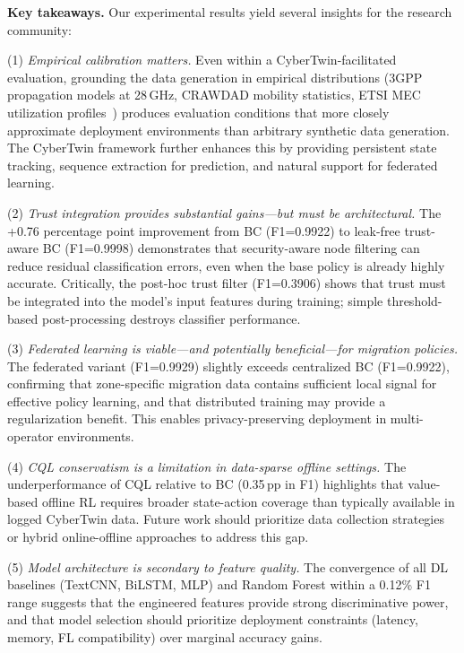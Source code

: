 \documentclass[journal,twoside]{IEEEtran}
\begin{document}
\textbf{Key takeaways.} Our experimental results yield several insights for the research community:

(1) \textit{Empirical calibration matters.} Even within a CyberTwin-facilitated evaluation, grounding the data generation in empirical distributions (3GPP propagation models at 28\,GHz, CRAWDAD mobility statistics, ETSI MEC utilization profiles~\cite{etsi_mec003}) produces evaluation conditions that more closely approximate deployment environments than arbitrary synthetic data generation. The CyberTwin framework further enhances this by providing persistent state tracking, sequence extraction for prediction, and natural support for federated learning.

(2) \textit{Trust integration provides substantial gains---but must be architectural.} The +0.76 percentage point improvement from BC (F1=0.9922) to leak-free trust-aware BC (F1=0.9998) demonstrates that security-aware node filtering can reduce residual classification errors, even when the base policy is already highly accurate. Critically, the post-hoc trust filter (F1=0.3906) shows that trust must be integrated into the model's input features during training; simple threshold-based post-processing destroys classifier performance.

(3) \textit{Federated learning is viable---and potentially beneficial---for migration policies.} The federated variant (F1=0.9929) slightly exceeds centralized BC (F1=0.9922), confirming that zone-specific migration data contains sufficient local signal for effective policy learning, and that distributed training may provide a regularization benefit. This enables privacy-preserving deployment in multi-operator environments.

(4) \textit{CQL conservatism is a limitation in data-sparse offline settings.} The underperformance of CQL relative to BC (0.35\,pp in F1) highlights that value-based offline RL requires broader state-action coverage than typically available in logged CyberTwin data. Future work should prioritize data collection strategies or hybrid online-offline approaches to address this gap.

(5) \textit{Model architecture is secondary to feature quality.} The convergence of all DL baselines (TextCNN, BiLSTM, MLP) and Random Forest within a 0.12\% F1 range suggests that the engineered features provide strong discriminative power, and that model selection should prioritize deployment constraints (latency, memory, FL compatibility) over marginal accuracy gains.
\end{document}
